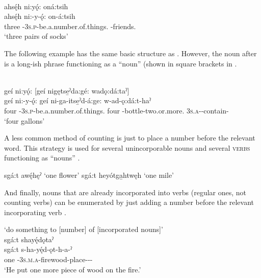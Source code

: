 \newpage
\ea\label{ex:countplaceholdex10} \stem{\textsc{number} \stem{\exsc{ni-y}-ǫ:} [thing]]}\\
ahsę́h ni:yǫ́: oná:tsih  \\
\gll ahsę́h ni:-y-ǫ́: on-á:tsih\\
three  {\partitive}-\textsc{3s.p}-be.a.number.of.things.{\stative} -friends.{\stative}\\
\glt ‘three pairs of socks’
\z


The following example has the same basic structure as . However, the noun after  is a long-ish phrase functioning as a “noun” (shown in square brackets in .

\ea\label{ex:countplaceholdex11} \\
geí ni:yǫ́: [geí nigętse̱ˀda:gé: wadǫ:dá:taˀ] \\
\gll geí ni:-y-ǫ́: geí ni-ga-itse̱ˀd-á:ge: w-ad-ǫ:dá:t-haˀ\\
four {\partitive}-\textsc{3s.p}-be.a.number.of.things.{\stative} four -bottle-two.or.more.{\stative} \textsc{3s.a}-{\semireflexive}-contain-{\habitual}\\
\glt ‘four gallons’
\z


A less common method of counting is just to place a number before the relevant word. This strategy is used for several unincorporable nouns  and several \textsc{verbs} functioning as “nouns” .

\ea\label{ex:countplaceholdex12} 
\ea sgá:t awę́hęˀ ‘one flower’\label{ex:countplaceholdex12a}
\ex sgá:t heyótga̱htwęh ‘one mile’\label{ex:countplaceholdex12b}
\z
\z

And finally, nouns that are already incorporated into verbs (regular ones, not counting verbs) can be enumerated by just adding a number before the relevant incorporating verb .
 
\ea\label{ex:countplaceholdex13}  ‘do something to [number] of [incorporated nouns]’\\
sgá:t shayę́dǫtaˀ  \\
\gll sgá:t s-ha-yę́d-ǫt-h-a-ˀ\\
one  {\repetitive}-\textsc{3s.m.a}-firewood-place-{\dislocative}-{\joinerA}-{\punctual}\\
\glt ‘He put one more piece of wood on the fire.’
\z

